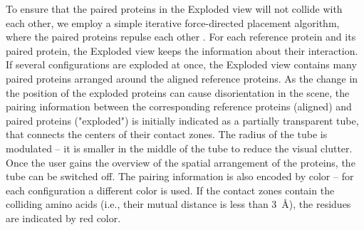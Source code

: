 \documentclass{bmcart}
\def\ExpView {Exploded view\xspace}
\begin{document}
To ensure that the paired proteins in the Exploded view will not collide with each other, we employ a simple iterative force-directed placement algorithm, where the paired proteins repulse each other \cite{fruchterman1991graph}.
For each reference protein and its paired protein, the \ExpView keeps the information about their interaction.
If several configurations are exploded at once, the \ExpView contains many paired proteins arranged around the aligned reference proteins.
As the change in the position of the exploded proteins can cause disorientation in the scene, the pairing information between the corresponding reference proteins (aligned) and paired proteins ("exploded") is initially indicated as a partially transparent tube, that connects the centers of their contact zones.
The radius of the tube is modulated -- it is smaller in the middle of the tube to reduce the visual clutter.
Once the user gains the overview of the spatial arrangement of the proteins, the tube can be switched off.
The pairing information is also encoded by color -- for each configuration a different color is used.
If the contact zones contain the colliding amino acids (i.e., their mutual distance is less than 3~\AA), the residues are indicated by red color.
\end{document}

